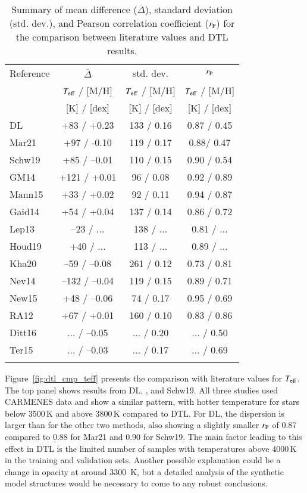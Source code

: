 \documentclass{aa}
\begin{document}
\begin{table}[]
\caption{Summary of mean difference ($\overline{\Delta}$), standard deviation (std. dev.), and Pearson correlation coefficient ($r_{\rm P}$) for the comparison between literature values and DTL results.}
\label{tab:pearson_lit}
\centering %
\begin{tabular}{l ccc}
    \hline 
    \hline 
    \noalign{\smallskip}
    Reference & $\overline{\Delta}$ & std. dev. &  $r_{\rm P}$ \\
            &   $T_{\rm eff}$ / [M/H] & $T_{\rm eff}$ / [M/H] & $T_{\rm eff}$ / [M/H]\\
            & [K] / [dex] & [K] / [dex]
            & [K] / [dex] \\
\noalign{\smallskip}
\hline
\noalign{\smallskip}
DL  & +83 / +0.23 & 133 / 0.16 & 0.87 / 0.45 \\
Mar21  & +97 / -0.10 & 119 / 0.17 & 0.88/ 0.47 \\
Schw19  & +85 / --0.01 & 110 / 0.15 & 0.90 / 0.54 \\
GM14  & +121 / +0.01 & 96 / 0.08 & 0.92 / 0.89 \\
Mann15  & +33 / +0.02 & 92 / 0.11 & 0.94 / 0.87 \\
Gaid14  & +54 / +0.04 & 137 / 0.14 & 0.86 / 0.72 \\
Lep13  & --23 / ... & 138 / ... & 0.81 / ... \\
Houd19  & +40 / ... & 113 / ... & 0.89 / ... \\
Kha20  & --59 / --0.08 & 261 / 0.12 & 0.73 / 0.81 \\
Nev14  & --132 / --0.04 & 119 / 0.15 & 0.89 / 0.71 \\
New15  & +48 / --0.06 & 74 / 0.17 & 0.95 / 0.69 \\
RA12  & +67 / +0.01 & 160 / 0.10 & 0.83 / 0.86 \\
Ditt16  & ... / --0.05 & ... / 0.20 & ... / 0.50 \\
Ter15  & ... / --0.03 & ... / 0.17 & ... / 0.69 \\
\noalign{\smallskip}
\hline
\end{tabular}
\end{table}


Figure~\ref{fig:dtl_cmp_teff} presents the comparison with literature values for $T_{\rm eff}$. The top panel shows results from DL, \citet[][Mar21]{marfil2021carmenes}, and Schw19. All three studies used CARMENES data and show a similar pattern, with hotter temperature for stars below 3500\,K and above 3800\,K compared to DTL. For DL, the dispersion is larger than for the other two methods, also showing a slightly smaller $r_{\rm P}$ of 0.87 compared to 0.88 for Mar21 and 0.90 for Schw19. The main factor leading to this effect in DTL is the limited number of samples with temperatures above 4000\,K in the training and validation sets. Another possible explanation could be a change in opacity at around 3300~K, but a detailed analysis of the synthetic model structures would be necessary to come to any robust conclusions.
\end{document}
